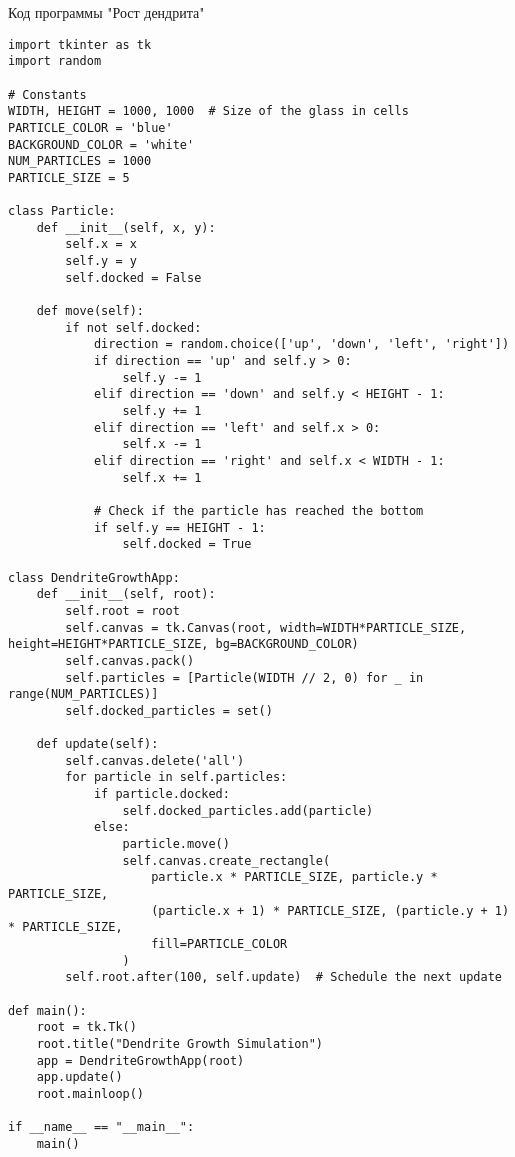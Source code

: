 \documentclass[14pt, oneside]{altsu-report}
\begin{document}
\begin{center}
\label{code:appendix}Код программы "Рост дендрита"
\end{center}

\begin{verbatim}
import tkinter as tk
import random

# Constants
WIDTH, HEIGHT = 1000, 1000  # Size of the glass in cells
PARTICLE_COLOR = 'blue'
BACKGROUND_COLOR = 'white'
NUM_PARTICLES = 1000
PARTICLE_SIZE = 5

class Particle:
    def __init__(self, x, y):
        self.x = x
        self.y = y
        self.docked = False

    def move(self):
        if not self.docked:
            direction = random.choice(['up', 'down', 'left', 'right'])
            if direction == 'up' and self.y > 0:
                self.y -= 1
            elif direction == 'down' and self.y < HEIGHT - 1:
                self.y += 1
            elif direction == 'left' and self.x > 0:
                self.x -= 1
            elif direction == 'right' and self.x < WIDTH - 1:
                self.x += 1

            # Check if the particle has reached the bottom
            if self.y == HEIGHT - 1:
                self.docked = True

class DendriteGrowthApp:
    def __init__(self, root):
        self.root = root
        self.canvas = tk.Canvas(root, width=WIDTH*PARTICLE_SIZE, height=HEIGHT*PARTICLE_SIZE, bg=BACKGROUND_COLOR)
        self.canvas.pack()
        self.particles = [Particle(WIDTH // 2, 0) for _ in range(NUM_PARTICLES)]
        self.docked_particles = set()

    def update(self):
        self.canvas.delete('all')
        for particle in self.particles:
            if particle.docked:
                self.docked_particles.add(particle)
            else:
                particle.move()
                self.canvas.create_rectangle(
                    particle.x * PARTICLE_SIZE, particle.y * PARTICLE_SIZE,
                    (particle.x + 1) * PARTICLE_SIZE, (particle.y + 1) * PARTICLE_SIZE,
                    fill=PARTICLE_COLOR
                )
        self.root.after(100, self.update)  # Schedule the next update

def main():
    root = tk.Tk()
    root.title("Dendrite Growth Simulation")
    app = DendriteGrowthApp(root)
    app.update()
    root.mainloop()

if __name__ == "__main__":
    main()
\end{verbatim}
\end{document}
